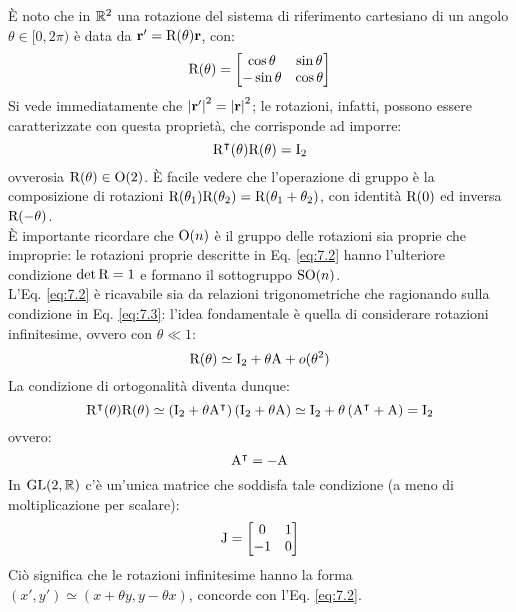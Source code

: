 È noto che in $ \mathbb{R}^2 $ una rotazione del sistema di riferimento cartesiano di un angolo $ \theta \in [0,2\pi) $ è data da $ \mathbf{r}' = \mathrm{R}(\theta) \mathbf{r} $, con:
\begin{equation}
	\mathrm{R}(\theta) =
	\begin{bmatrix}
		\cos \theta & \sin \theta \\
		-\sin \theta & \cos \theta
	\end{bmatrix}
	\label{eq:7.2}
\end{equation}
Si vede immediatamente che $ \left\lvert\mathbf{r}'\right\rvert^2 = \left\lvert\mathbf{r}\right\rvert^2 $; le rotazioni, infatti, possono essere caratterizzate con questa proprietà, che corrisponde ad imporre:
\begin{equation}
	\mathrm{R}^{\intercal}(\theta) \mathrm{R}(\theta) = \mathrm{I}_2
	\label{eq:7.3}
\end{equation}
ovverosia $ \mathrm{R}(\theta) \in \mathrm{O}(2) $. È facile vedere che l'operazione di gruppo è la composizione di rotazioni $ \mathrm{R}(\theta_1) \mathrm{R}(\theta_2) = \mathrm{R}(\theta_1 + \theta_2) $, con identità $ \mathrm{R}(0) $ ed inversa $ \mathrm{R}(-\theta) $.\\
È importante ricordare che $ \mathrm{O}(n) $ è il gruppo delle rotazioni sia proprie che improprie: le rotazioni proprie descritte in Eq. \ref{eq:7.2} hanno l'ulteriore condizione $ \det\mathrm{R} = 1 $ e formano il sottogruppo $ \mathrm{SO}(n) $.\\
L'Eq. \ref{eq:7.2} è ricavabile sia da relazioni trigonometriche che ragionando sulla condizione in Eq. \ref{eq:7.3}: l'idea fondamentale è quella di considerare rotazioni infinitesime, ovvero con $ \theta \ll 1 $:
\begin{equation}
	\mathrm{R}(\theta) \simeq \mathrm{I}_2 + \theta \mathrm{A} + o(\theta^2)
	\label{eq:7.4}
\end{equation}
La condizione di ortogonalità diventa dunque:
\begin{equation*}
	\mathrm{R}^{\intercal}(\theta) \mathrm{R}(\theta) \simeq \left( \mathrm{I}_2 + \theta \mathrm{A}^{\intercal} \right) \left( \mathrm{I}_2 + \theta \mathrm{A} \right) \simeq \mathrm{I}_2 + \theta \left( \mathrm{A}^{\intercal} + \mathrm{A} \right) = \mathrm{I}_2
\end{equation*}
ovvero:
\begin{equation}
	\mathrm{A}^{\intercal} = - \mathrm{A}
	\label{eq:7.5}
\end{equation}
In $ \mathrm{GL}(2,\mathbb{R}) $ c'è un'unica matrice che soddisfa tale condizione (a meno di moltiplicazione per scalare):
\begin{equation}
	\mathrm{J} =
	\begin{bmatrix}
		0 & 1 \\
		-1 & 0
	\end{bmatrix}
	\label{eq:7.6}
\end{equation}
Ciò significa che le rotazioni infinitesime hanno la forma $ (x',y') \simeq (x + \theta y, y - \theta x) $, concorde con l'Eq. \ref{eq:7.2}.

